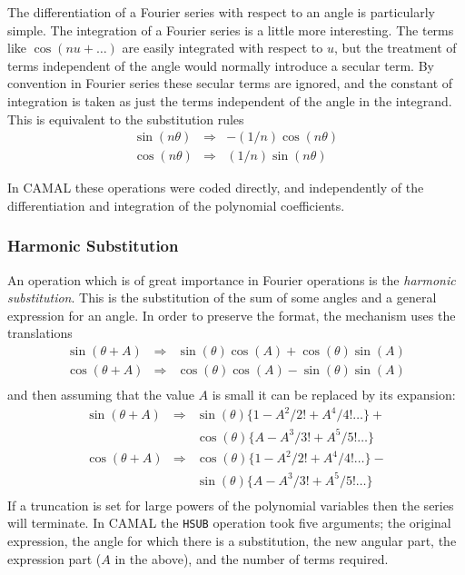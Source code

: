 The differentiation of a Fourier series with respect to an angle is
particularly simple.  The integration of a Fourier series is a little
more interesting.  The terms like $\cos(n u + \ldots)$ are easily
integrated with respect to $u$, but the treatment of terms independent
of the angle would normally introduce a secular term.  By convention
in Fourier series these secular terms are ignored, and the constant of
integration is taken as just the terms independent of the angle in the
integrand.  This is equivalent to the substitution rules
\begin{eqnarray*}
\sin(n \theta) & \Rightarrow & -(1/n) \cos(n \theta) \\
\cos(n \theta) & \Rightarrow & (1/n) \sin(n \theta)
\end{eqnarray*}

In CAMAL these operations were coded directly, and independently of
the differentiation and integration of the polynomial coefficients.

\subsubsection{Harmonic Substitution}

An operation which is of great importance in Fourier operations is the
\emph{harmonic substitution}.  This is the substitution of the sum of
some angles and a general expression for an angle.  In order to
preserve the format, the mechanism uses the translations
\begin{eqnarray*}
\sin(\theta + A) & \Rightarrow & \sin(\theta) \cos(A) +
                                 \cos(\theta) \sin(A) \\
\cos(\theta + A) & \Rightarrow & \cos(\theta) \cos(A) -
                                 \sin(\theta) \sin(A) \\
\end{eqnarray*}
and then assuming that the value $A$ is small it can be replaced by
its expansion:
\begin{eqnarray*}
\sin(\theta + A) & \Rightarrow & \sin(\theta) \{1 - A^2/2! + A^4/4!\ldots\} +\\
                 &             & \cos(\theta) \{A - A^3/3! + A^5/5!\ldots\} \\
\cos(\theta + A) & \Rightarrow & \cos(\theta) \{1 - A^2/2! + A^4/4!\ldots\} -\\
                 &             & \sin(\theta) \{A - A^3/3! + A^5/5! \ldots\} \\
\end{eqnarray*}
If a truncation is set for large powers of the polynomial variables
then the series will terminate.  In CAMAL the \texttt{HSUB} operation
took five arguments; the original expression, the angle for which
there is a substitution, the new angular part, the expression part
($A$ in the above), and the number of terms required.

